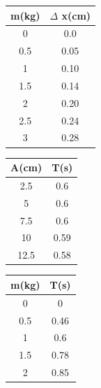\documentclass{article}
\begin{document}
	\begin{tabular}{|c|c|}
		\hline m(kg) & $\Delta$ x(cm)\\
		\hline 0 & 0.0\\
		\hline 0.5 & 0.05\\
		\hline 1 & 0.10\\
		\hline 1.5 & 0.14\\
		\hline 2 & 0.20\\
		\hline 2.5 & 0.24\\
		\hline 3 & 0.28\\
		\hline
	\end{tabular}
	\hspace{1.5cm}
	\begin{tabular}{|c|c|}
		\hline A(cm) & T(s)\\
		\hline 2.5 & 0.6\\
		\hline 5 & 0.6\\
		\hline 7.5 & 0.6\\
		\hline 10 & 0.59\\
		\hline 12.5 & 0.58\\
		\hline
	\end{tabular}
	\hspace{1.5cm}
	\begin{tabular}{|c|c|}
		\hline m(kg) & T(s)\\
		\hline 0 & 0\\
		\hline 0.5 & 0.46\\
		\hline 1 & 0.6\\
		\hline 1.5 & 0.78\\
		\hline 2 & 0.85\\
		\hline
	\end{tabular}
	\vspace{1cm}
	\\
\end{document}
